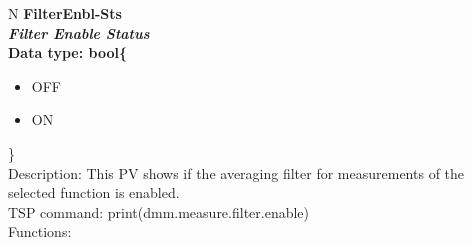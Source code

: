 \documentclass[openany]{article}
\begin{document}
		\begin{tabular}{N}
			\hline
			\bfseries FilterEnbl-Sts\label{pv:filterenbl-sts} \\ \hline
			\emph{Filter Enable Status} \\
			Data type: bool\{\begin{itemize}[noitemsep]
				\item[] OFF
				\item[] ON
			\end{itemize}\} \\
			Description: This PV shows if the averaging filter for measurements of the selected function is enabled. \\
			TSP command: print(dmm.measure.filter.enable) \\
			Functions: \\
			\arrayrulecolor{\FuncTableBorderColor}

		\end{tabular}
\end{document}
